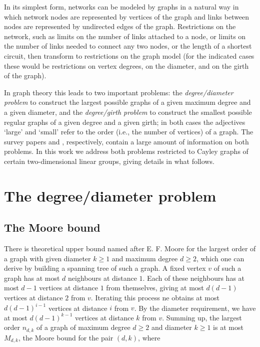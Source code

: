 \documentclass[a4paper,12pt,oneside]{report}%
\begin{document}
In its simplest form, networks can be modeled by graphs in a natural way in which network nodes are represented by vertices of the graph and links between nodes are represented by undirected edges of the graph. Restrictions on the network, such as limits on the number of links attached to a node, or limits on the number of links needed to connect any two nodes, or the length of a shortest circuit, then transform to restrictions on the graph model (for the indicated cases these would be restrictions on vertex degrees, on the diameter, and on the girth of the graph).
\medskip

In graph theory this leads to two important problems: the {\em degree/diameter problem} to construct the largest possible graphs of a given maximum degree and a given diameter, and the {\em degree/girth problem} to construct the smallest possible regular graphs of a given degree and a given girth; in both cases the adjectives `large' and `small' refer to the order (i.e., the number of vertices) of a graph. The survey papers \cite{Mil-Sir} and \cite{Exo-Jaj}, respectively, contain a large amount of information on both problems. In this work we address both problems restricted to Cayley graphs of certain two-dimensional linear groups, giving details in what follows.


\newpage


\section{The degree/diameter problem}
\subsection{The Moore bound}

There is theoretical upper bound named after E. F. Moore for the largest order of a graph with given diameter $k\ge 1$ and maximum degree $d\ge 2$, which one can derive by building a spanning tree of such a graph. A fixed vertex $v$ of such a graph has at most $d$ neighbours at distance $1$. Each of these neighbours has at most $d-1$ vertices at distance $1$ from themselves, giving at most $d(d-1)$ vertices at distance $2$ from $v$. Iterating this process ne obtains at most $d(d-1)^{i-1}$ vertices at distance $i$ from $v$. By the diameter requirement, we have at most $d(d-1)^{k-1}$ vertices at distance $k$ from $v$. Summing up, the largest order $n_{d,k}$ of a graph of maximum degree $d\ge 2$ and diameter $k\ge 1$ is at most $M_{d,k}$, the Moore bound for the pair $(d,k)$, where
\end{document}
